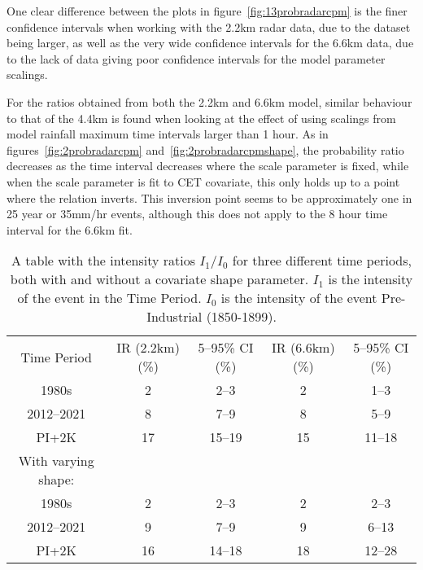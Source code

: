 One clear difference between the plots in figure~\ref{fig:13probradarcpm} is the finer confidence intervals
    when working with the 2.2km radar data, due to the dataset being larger,
    as well as the very wide confidence intervals for the 6.6km data,
    due to the lack of data giving poor confidence intervals for the model parameter scalings.

For the ratios obtained from both the 2.2km and 6.6km model,
    similar behaviour to that of the 4.4km is found when looking at the effect of using scalings from model rainfall maximum time intervals larger than 1 hour.
As in figures~\ref{fig:2probradarcpm} and~\ref{fig:2probradarcpmshape},
    the probability ratio decreases as the time interval decreases where the scale parameter is fixed,
    while when the scale parameter is fit to CET covariate,
    this only holds up to a point where the relation inverts.
This inversion point seems to be approximately one in 25 year or 35mm/hr events,
    although this does not apply to the 8 hour time interval for the 6.6km fit.

\begin{table}[H]
   \centering
    \begin{tabular}{c c c c c}
        Time Period & IR (2.2km) (\%) & 5--95\% CI (\%) & IR (6.6km) (\%) & 5--95\% CI (\%) \\
        1980s & 2 & 2--3 & 2 & 1--3 \\
        2012--2021 & 8 & 7--9 & 8 & 5--9 \\
        PI+2K & 17 & 15--19 & 15 & 11--18 \\
        With varying shape: &&&& \\
        1980s & 2 & 2--3 & 2 & 2--3 \\
        2012--2021 & 9 & 7--9 & 9 & 6--13 \\
        PI+2K & 16 & 14--18 & 18 & 12--28 \\
    \end{tabular}
    \caption{A table with the intensity ratios $I_1/I_0$ for three different time periods,
        both with and without a covariate shape parameter.
    $I_1$ is the intensity of the event in the Time Period.
    $I_0$ is the intensity of the event Pre-Industrial (1850-1899).}
    \label{tab:13irtable}
\end{table}

